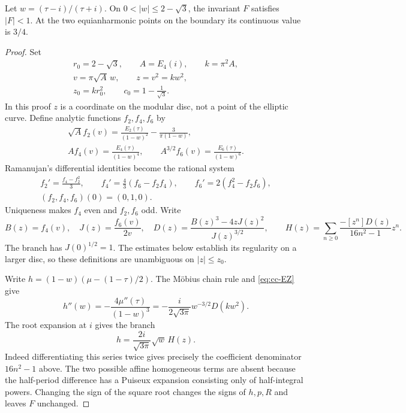 \begin{statement}
Let $w=(\tau-i)/(\tau+i)$. On
$0<|w|\le2-\sqrt3$, the invariant $F$ satisfies $|F|<1$.
At the two equianharmonic points on the boundary its continuous
value is $3/4$.
\end{statement}
\begin{proof}
Set
\[
 \begin{gathered}
 r_0=2-\sqrt3,\qquad A=E_4(i),\qquad k=\pi^2A,\\
 v=\pi\sqrt A\,w,\qquad z=v^2=kw^2,\\
 z_0=kr_0^2,\qquad c_0=1-\frac1{\sqrt3}.
 \end{gathered}
\]
In this proof $z$ is a coordinate on the modular disc, not a
point of the elliptic curve. Define analytic functions $f_2,f_4,f_6$
by
\[
 \begin{gathered}
 \sqrt A f_2(v)=\frac{E_2(\tau)}{(1-w)^2}
                         -\frac3{\pi(1-w)},\\
 A f_4(v)=\frac{E_4(\tau)}{(1-w)^4},\qquad
 A^{3/2} f_6(v)=\frac{E_6(\tau)}{(1-w)^6}.
 \end{gathered}
\]
Ramanujan's differential identities become the rational system
\begin{equation}\label{eq:cc-ode}
 \begin{gathered}
 f_2'=\frac{f_4-f_2^2}{3},\qquad
 f_4'=\frac43(f_6-f_2f_4),\qquad
 f_6'=2(f_4^2-f_2f_6),\\
 (f_2,f_4,f_6)(0)=(0,1,0).
 \end{gathered}
\end{equation}
Uniqueness makes $f_4$ even and $f_2,f_6$ odd. Write
\[
 B(z)=f_4(v),\quad J(z)=\frac{f_6(v)}{2v},\quad
 D(z)=\frac{B(z)^3-4zJ(z)^2}{J(z)^{3/2}},\qquad
 H(z)=\sum_{n\ge0}\frac{-[z^n]D(z)}{16n^2-1}z^n.
\]
The branch has $J(0)^{1/2}=1$. The estimates below establish
its regularity on a larger disc, so these definitions are
unambiguous on $|z|\le z_0$.

Write $h=(1-w)(\mu-(1-\tau)/2)$. The Möbius chain rule and
\eqref{eq:cc-EZ} give
\[
 h''(w)=-\frac{4\mu''(\tau)}{(1-w)^3}
       =-\frac{i}{2\sqrt{3\pi}}w^{-3/2}D(kw^2).
\]
The root expansion at $i$ gives the branch
\begin{equation}\label{eq:cc-h}
 h=\frac{2i}{\sqrt{3\pi}}\sqrt w\,H(z).
\end{equation}
Indeed differentiating this series twice gives precisely the
coefficient denominator $16n^2-1$ above. The two possible affine
homogeneous terms are absent because the half-period difference
has a Puiseux expansion consisting only of half-integral powers.
Changing the sign of the square root changes the signs of $h,p,R$
and leaves $F$ unchanged.


\end{proof}
